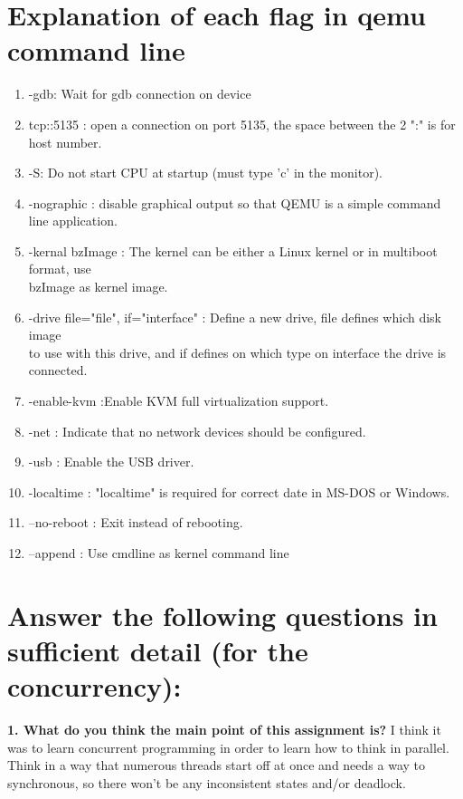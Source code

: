 \documentclass[draftclsnofoot,onecolumn,letterpaper,10pt,titlepage]{IEEEtran}
\begin{document}
\section{Explanation of each flag in qemu command line}
\begin{enumerate}
\item -gdb: Wait for gdb connection on device
\item tcp::5135 : open a connection on port 5135, the space between the 2 ":" is for host number.
\item -S: Do not start CPU at startup (must type ’c’ in the monitor).
\item -nographic : disable graphical output so that QEMU is a simple command line application.
\item -kernal bzImage : The kernel can be either a Linux kernel or in multiboot format, use \\ 
bzImage as kernel image.
\item -drive file="file", if="interface" : Define a new drive, file defines which disk image \\
to use with this drive, and if defines on which type on interface the drive is connected.
\item -enable-kvm :Enable KVM full virtualization support.
\item -net : Indicate that no network devices should be configured.
\item -usb : Enable the USB driver.
\item -localtime : "localtime" is required for correct date in MS-DOS or Windows.
\item --no-reboot : Exit instead of rebooting.
\item --append : Use cmdline as kernel command line
\end{enumerate}

\section{Answer the following questions in sufficient detail (for the concurrency):}
    \textbf{1. What do you think the main point of this assignment is?}
    I think it was to learn concurrent programming in order to learn how to think in parallel. Think in a way that numerous threads start off at once and needs a way to synchronous, so there won't be any inconsistent states and/or deadlock.    
\end{document}
